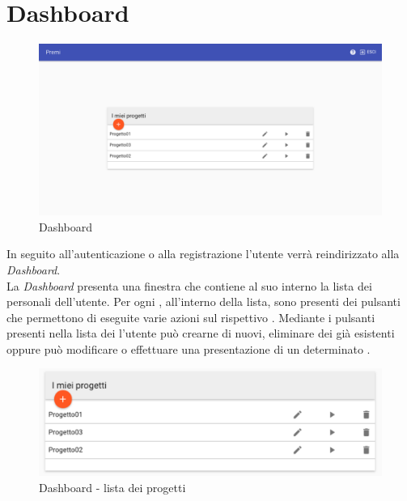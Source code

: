 \section{Dashboard} \label{dash}
\begin{figure}[H]
\centering
\includegraphics[scale=0.3]{immagini/dashboard.pdf}
\caption{Dashboard}
\end{figure}
In seguito all'autenticazione o alla registrazione l'utente verrà reindirizzato alla \textit{Dashboard}.\\
La \textit{Dashboard} presenta una finestra che contiene al suo interno la lista dei  personali dell'utente. Per ogni , all'interno della lista, sono presenti dei pulsanti che permettono di eseguite varie azioni sul rispettivo .
Mediante i pulsanti presenti nella lista dei  l'utente può crearne di nuovi, eliminare dei  già esistenti oppure può modificare o effettuare una presentazione di un determinato . \\
\begin{figure}[H]
\centering
\includegraphics[scale=0.5]{immagini/dashboardVuota.pdf}
\caption{Dashboard - lista dei progetti}
\end{figure}
